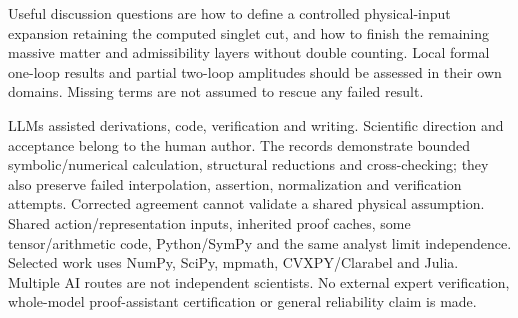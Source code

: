 \documentclass[10pt,letterpaper]{article}
\begin{document}
Useful discussion questions are how to define a controlled physical-input
expansion retaining the computed singlet cut, and how to finish the remaining
massive matter and admissibility layers without double counting. Local formal
one-loop results and partial two-loop amplitudes should be assessed in their
own domains. Missing terms are not assumed to rescue any failed result.

LLMs assisted derivations, code, verification and writing. Scientific direction
and acceptance belong to the human author. The records demonstrate bounded
symbolic/numerical calculation, structural reductions and cross-checking;
they also preserve failed interpolation, assertion, normalization and
verification attempts. Corrected agreement cannot validate a shared physical
assumption. Shared action/representation inputs, inherited proof caches,
some tensor/arithmetic code, Python/SymPy and the same analyst limit
independence. Selected work uses NumPy, SciPy, mpmath, CVXPY/Clarabel and
Julia. Multiple AI routes are not independent scientists. No external expert
verification, whole-model proof-assistant certification or general reliability
claim is made.
\end{document}
